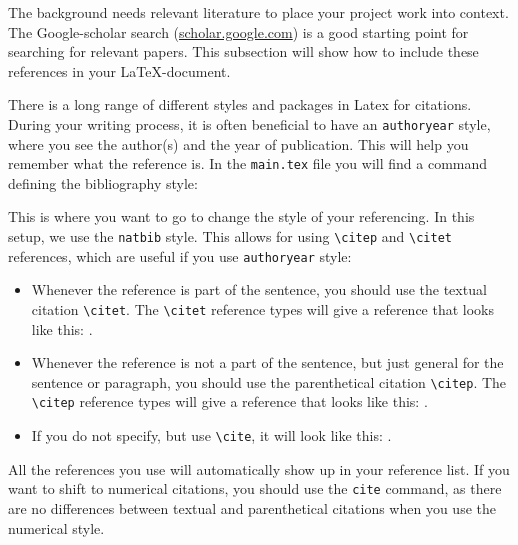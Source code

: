 The background needs relevant literature to place your project work into context. The Google-scholar search (\url{scholar.google.com}) is a good starting point for searching for relevant papers.  This subsection will show how to include these references in your \LaTeX-document.

There is a long range of different styles and packages in Latex for citations. During your writing process, it is often beneficial to have an \texttt{authoryear} style, where you see the author(s) and the year of publication. This will help you remember what the reference is. In the \texttt{main.tex} file you will find a command defining the bibliography style:


This is where you want to go to change the style of your referencing. In this setup, we use the \texttt{natbib} style. This allows for using \verb=\citep= and \verb=\citet= references, which are useful if you use \texttt{authoryear} style:
\begin{itemize}
    \item Whenever the reference is part of the sentence, you should use the textual citation \verb=\citet=. The \verb=\citet= reference types will give a reference that looks like this: \citet{berg2014permeability}.
    \item Whenever the reference is not a part of the sentence, but just general for the sentence or paragraph, you should use the parenthetical citation \verb=\citep=. The \verb=\citep= reference types will give a reference that looks like this: \citep{berg2014permeability}.
    \item If you do not specify, but use \verb=\cite=, it will look like this: \cite{berg2014permeability}.
\end{itemize}

All the references you use will automatically show up in your reference list. If you want to shift to numerical citations, you should use the \texttt{cite} command, as there are no differences between textual and parenthetical citations when you use the numerical style.